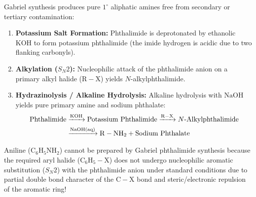 \documentclass[10pt,a4paper]{article}
\begin{document}
\begin{conceptbox}
Gabriel synthesis produces pure $1^\circ$ aliphatic amines free from secondary or tertiary contamination:
\begin{enumerate}[leftmargin=*]
  \item \textbf{Potassium Salt Formation:} Phthalimide is deprotonated by ethanolic $\mathrm{KOH}$ to form potassium phthalimide (the imide hydrogen is acidic due to two flanking carbonyls).
  \item \textbf{Alkylation ($S_N2$):} Nucleophilic attack of the phthalimide anion on a primary alkyl halide ($\mathrm{R-X}$) yields $N$-alkylphthalimide.
  \item \textbf{Hydrazinolysis / Alkaline Hydrolysis:} Alkaline hydrolysis with $\mathrm{NaOH}$ yields pure primary amine and sodium phthalate:
  \begin{align}
    \text{Phthalimide} &\xrightarrow{\mathrm{KOH}} \text{Potassium Phthalimide} \xrightarrow{\mathrm{R-X}} N\text{-Alkylphthalimide} \notag \\
    &\xrightarrow{\mathrm{NaOH(aq)}} \mathbf{\mathrm{R-NH_2}} + \text{Sodium Phthalate}
  \end{align}
\end{enumerate}
\end{conceptbox}

\begin{trapbox}
Aniline ($\mathrm{C_6H_5NH_2}$) cannot be prepared by Gabriel phthalimide synthesis because the required aryl halide ($\mathrm{C_6H_5-X}$) does not undergo nucleophilic aromatic substitution ($S_N2$) with the phthalimide anion under standard conditions due to partial double bond character of the $\mathrm{C-X}$ bond and steric/electronic repulsion of the aromatic ring!
\end{trapbox}
\end{document}
